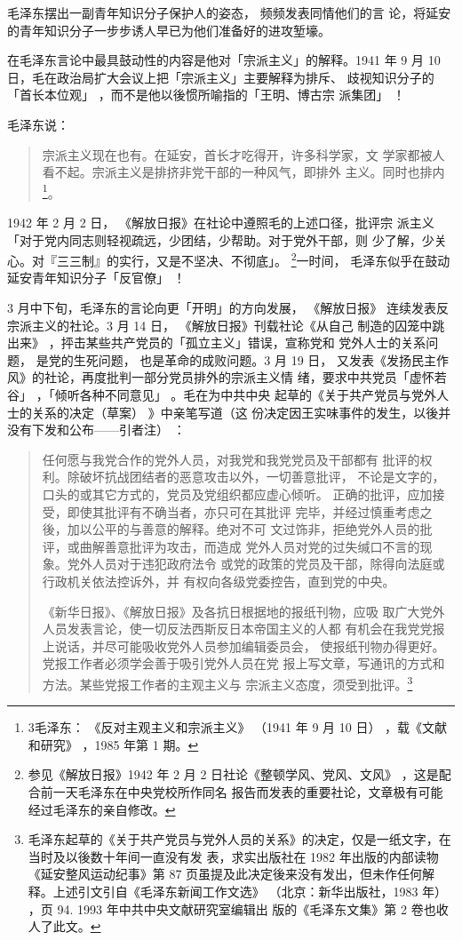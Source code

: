 毛泽东摆出一副青年知识分子保护人的姿态，
频频发表同情他们的言
论，将延安的青年知识分子一步步诱人早已为他们准备好的进攻堑壕。

在毛泽东言论中最具鼓动性的内容是他对「宗派主义」的解释。1941
年 9 月 10 日，毛在政治局扩大会议上把「宗派主义」主要解释为排斥、
歧视知识分子的「首长本位观」
，而不是他以後惯所喻指的「王明、博古宗
派集团」
！

毛泽东说：
\begin{quote}
{\fzwkai 宗派主义现在也有。在延安，首长才吃得开，许多科学家，文
学家都被人看不起。宗派主义是排挤非党干部的一种风气，即排外
主义。同时也排内\footnote{3毛泽东：
《反对主观主义和宗派主义》
（1941 年 9 月 10 日）
，载《文献和研究》
，1985 年第 1 期。}。
}
\end{quote}
1942 年 2 月 2 日，
《解放日报》在社论中遵照毛的上述口径，批评宗
派主义「对于党内同志则轻视疏远，少团结，少帮助。对于党外干部，则
少了解，少关心。对『三三制』的实行，又是不坚决、不彻底」。
\footnote{参见《解放日报》1942 年 2 月 2 日社论《整顿学风、党风、文风》
，这是配合前一天毛泽东在中央党校所作同名
报告而发表的重要社论，文章极有可能经过毛泽东的亲自修改。}一时间，
毛泽东似乎在鼓动延安青年知识分子「反官僚」
！

3 月中下旬，毛泽东的言论向更「开明」的方向发展，
《解放日报》
连续发表反宗派主义的社论。3 月 14 日，
《解放日报》刊载社论《从自己
制造的囚笼中跳出来》
，抨击某些共产党员的「孤立主义」错误，宣称党和
党外人士的关系问题，
是党的生死问题，
也是革命的成败问题。3 月 19 日，
又发表《发扬民主作风》的社论，再度批判一部分党员排外的宗派主义情
绪，要求中共党员「虚怀若谷」
，「倾听各种不同意见」
。毛在为中共中央
起草的《关于共产党员与党外人士的关系的决定（草案）
》中亲笔写道（这
份决定因王实味事件的发生，以後并没有下发和公布——引者注）
：
\begin{quote}
{\fzwkai 任何愿与我党合作的党外人员，对我党和我党党员及干部都有
批评的权利。除破坏抗战团结者的恶意攻击以外，一切善意批评，
不论是文字的，口头的或其它方式的，党员及党组织都应虚心倾听。
正确的批评，应加接受，即使其批评有不确当者，亦只可在其批评
完毕，并经过慎重考虑之後，加以公平的与善意的解释。绝对不可
文过饰非，拒绝党外人员的批评，或曲解善意批评为攻击，而造成
党外人员对党的过失缄口不言的现象。党外人员对于违犯政府法令
或党的政策的党员及干部，除得向法庭或行政机关依法控诉外，并
有权向各级党委控告，直到党的中央。

《新华日报》、《解放日报》及各抗日根据地的报纸刊物，应吸
取广大党外人员发表言论，使一切反法西斯反日本帝国主义的人都
有机会在我党党报上说话，并尽可能吸收党外人员参加编辑委员会，
使报纸刊物办得更好。党报工作者必须学会善于吸引党外人员在党
报上写文章，写通讯的方式和方法。某些党报工作者的主观主义与
宗派主义态度，须受到批评。\footnote{毛泽东起草的《关于共产党员与党外人员的关系》的决定，仅是一纸文字，在当时及以後数十年间一直没有发
表，求实出版社在 1982 年出版的内部读物《延安整风运动纪事》第 87 页虽提及此决定後来没有发出，但未作任何解
释。上述引文引自《毛泽东新闻工作文选》
（北京：新华出版社，1983 年）
，页 94. 1993 年中共中央文献研究室编辑出
版的《毛泽东文集》第 2 卷也收人了此文。
}}
\end{quote}

